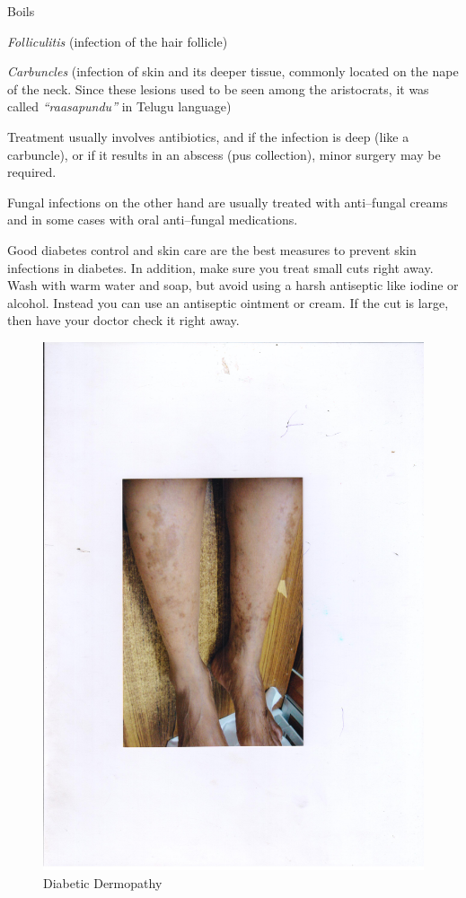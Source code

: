  \item Boils

 \item \textit{Folliculitis} (infection of the hair follicle)

 \item \textit{Carbuncles} (infection of skin and its deeper tissue, commonly located on the nape of the neck. Since these lesions used to be seen among the aristocrats, it was called \textit{“raasapundu”} in Telugu language)

Treatment usually involves antibiotics, and if the infection is deep (like a carbuncle), or if it results in an abscess (pus collection), minor surgery may be required.

Fungal infections on the other hand are usually treated with anti–fungal creams and in some cases with oral anti–fungal medications.

Good diabetes control and skin care are the best measures to prevent skin infections in diabetes. In addition, make sure you treat small cuts right away. Wash with warm water and soap, but avoid using a harsh antiseptic like iodine or alcohol. Instead you can use an antiseptic ointment or cream. If the cut is large, then have your doctor check it right away.

\begin{figure}
\includegraphics{images/072.jpg}
\caption{Diabetic Dermopathy}
\end{figure}


